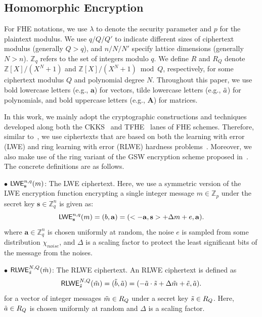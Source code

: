 \subsection{Homomorphic Encryption}\label{pre:he_type}
For FHE notations, we use $\lambda$ to denote the security 
parameter and $p$ for the plaintext modulus. 
We use $q/Q/Q'$ to indicate different sizes of ciphertext modulus (generally $Q>q$),  
and $n/N/N'$ specify lattice dimensions (generally $N>n$).
$\mathbb{Z}_{q}$ refers to the set of integers 
modulo $q$. We define $R$ and $R_{Q}$ denote $\mathbb{Z}[X]/(X^{N}+1)$
and $\mathbb{Z}[X]/(X^{N}+1) \bmod Q$, respectively, for 
some ciphertext modulus $Q$ and polynomial degree $N$.
Throughout this paper, we use bold lowercase letters (e.g., $\mathbf{a}$) for vectors, 
tilde lowercase letters (e.g., $\Tilde{a}$) for polynomials, 
and bold uppercase letters (e.g., $\mathbf{A}$) for matrices.

In this work, we mainly adopt the cryptographic constructions and 
techniques~\cite{DBLP:conf/ctrsa/hps19, DBLP:journals/access/s2cc2s, 
DBLP:journals/iacr/hs20,  DBLP:conf/asiacrypt/tfhepbs, 
pegasus,  DBLP:journals/tifs/apas,  cheetah,
ckksbootsparse, ckksbootstrap,ckksbootvariance} 
developed along both the CKKS~\cite{DBLP:conf/asiacrypt/CheonKKS17} and 
TFHE~\cite{DBLP:journals/joc/ChillottiGGI20} lanes of FHE schemes. Therefore, similar
to~\cite{heda}, we use ciphertexts that are based on both the 
learning with error (LWE) and ring learning with error (RLWE) hardness 
problems~\cite{regev2009lattices,lyubashevsky2010ideal}.
Moreover, we also make use of 
the ring variant of the GSW encryption scheme proposed in~\cite{DBLP:conf/crypto/GentrySW13}.
The concrete definitions are as follows.

$\bullet$ ${\mathsf{LWE}}_{\mathbf{s}}^{n, q}(m)$: The LWE ciphertext.
Here, we use a symmetric version of the LWE encryption function encrypting a single
integer message $m \in \mathbb{Z}_p$ under the secret key $\mathbf{s} \in 
\mathbb{Z}_{q}^{n}$ is given as: 
\[
    {\mathsf{LWE}}_{\mathbf{s}}^{n,q}(m) = (b, \mathbf{a}) = 
    (<-\mathbf{a}, \mathbf{s}> + \Delta m + e, \mathbf{a}).
\]
where $\mathbf{a} \in \mathbb{Z}_{q}^{n}$ is chosen uniformly at random, 
the noise $e$ is sampled from some distribution $\chi_{noise}$, and
$\Delta$ is a scaling factor to protect the least significant bits 
of the message from the noises. 

$\bullet$ ${\mathsf{RLWE}}_{\Tilde{s}}^{N,Q}(\Tilde{m})$: The RLWE ciphertext.
An RLWE ciphertext is defined as
\[
    {\mathsf{RLWE}}_{\Tilde{s}}^{N,Q}(\Tilde{m}) = (\Tilde{b}, \Tilde{a}) = (-\Tilde{a} \cdot \Tilde{s} + \Delta \Tilde{m} + \Tilde{e}, \Tilde{a}).
\]
for a vector of integer messages $\Tilde{m}\in R_{Q}$ under a secret key 
$\Tilde{s} \in R_{Q}$. Here, 
$\Tilde{a} \in R_{Q}$ is chosen uniformly at random and $\Delta$ is a scaling factor. 


